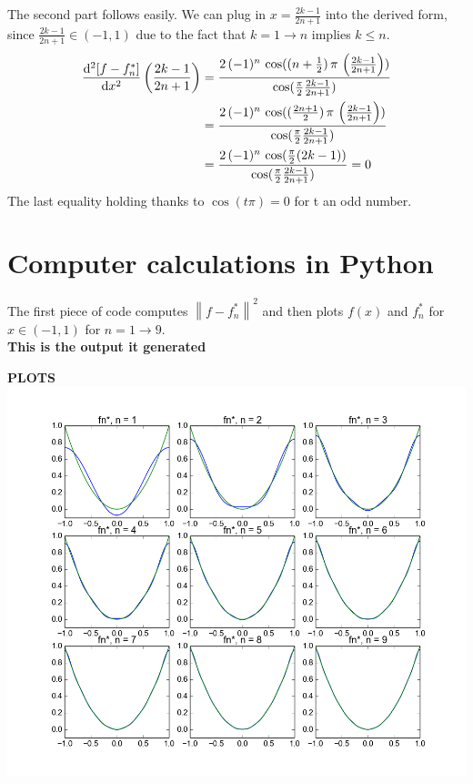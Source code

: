 \documentclass[12pt]{article}
\newcommand{\ddx}[2]{\frac{{\rm d}^#1#2}{{\rm d}x^#1}}
\newcommand{\norm}[1]{\left\|#1\right\|}
\begin{document}
The second part follows easily. We can plug in $x = \frac{2k-1}{2n+1}$ into the derived form, since
$\frac{2k-1}{2n+1} \in (-1, 1)$ due to the fact that $k = 1 \rightarrow n$ implies $k \leq n$.
\begin{align}
	\ddx{2}{[f-f_{n}^*]}\left(\frac{2k-1}{2n+1}\right)
		& =\frac{2\,(-1)^n\,\cos((n+\frac{1}{2})\,\pi\,\left(\frac{2k-1}{2n+1}\right))} {\cos(\frac{\pi}{2}\frac{2k-1}{2n+1})}\\
		&= \frac{2\,(-1)^n\,\cos((\frac{2n+1}{2})\,\pi\,\left(\frac{2k-1}{2n+1}\right))} {\cos(\frac{\pi}{2}\frac{2k-1}{2n+1})}\\
		& =\frac{2\,(-1)^n\,\cos(\frac{\pi}{2}(2k-1))} {\cos(\frac{\pi}{2}\frac{2k-1}{2n+1})}
		= 0
\end{align}
The last equality holding thanks to $\cos(t \pi) = 0$ for t an odd number.

\section{Computer calculations in Python}

The first piece of code computes $\norm{f - f_n^*}^2$ and then plots $f(x)$ and $f_n^*$ for $x \in (-1, 1)$ for $n = 1 \rightarrow 9$.\\


\textbf{This is the output it generated}

\clearpage
\textbf{PLOTS}\\

\hspace{-3em}
\includegraphics[scale=0.75]{graphsf.png}
\end{document}
